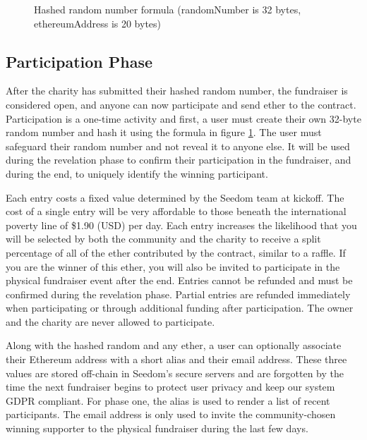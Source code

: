 \documentclass[11pt]{article}
\begin{document}
\begin{figure}[H]
\begin{center}
\caption{Hashed random number formula (randomNumber is 32 bytes, ethereumAddress is 20 bytes)}
\label{figure:hashedRandomNumberFormula}
\end{center}
\end{figure}

\subsection{Participation Phase}

After the charity has submitted their hashed random number, the fundraiser is considered open, and anyone can now participate and send ether to the contract. Participation is a one-time activity and first, a user must create their own 32-byte random number and hash it using the formula in figure \ref{figure:hashedRandomNumberFormula}. The user must safeguard their random number and not reveal it to anyone else. It will be used during the revelation phase to confirm their participation in the fundraiser, and during the end, to uniquely identify the winning participant.

Each entry costs a fixed value determined by the Seedom team at kickoff. The cost of a single entry will be very affordable to those beneath the international poverty line of \$1.90 (USD) per day\cite{1}. Each entry increases the likelihood that you will be selected by both the community and the charity to receive a split percentage of all of the ether contributed by the contract, similar to a raffle. If you are the winner of this ether, you will also be invited to participate in the physical fundraiser event after the end. Entries cannot be refunded and must be confirmed during the revelation phase. Partial entries are refunded immediately when participating or through additional funding after participation. The owner and the charity are never allowed to participate.

Along with the hashed random and any ether, a user can optionally associate their Ethereum address with a short alias and their email address. These three values are stored off-chain in Seedom's secure servers and are forgotten by the time the next fundraiser begins to protect user privacy and keep our system GDPR compliant. For phase one, the alias is used to render a list of recent participants. The email address is only used to invite the community-chosen winning supporter to the physical fundraiser during the last few days.
\end{document}
